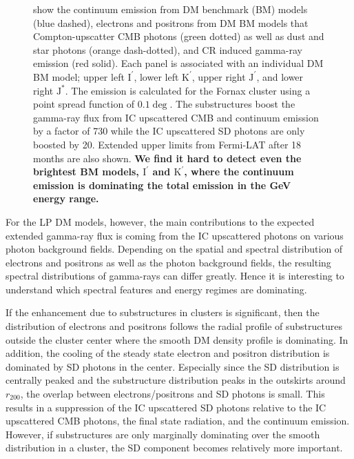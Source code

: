 \documentclass[10pt,aps,pra,reprint,amsmath,amsfonts,amssymb,showpacs,nofootinbib,floatfix]{revtex4-1}
\def\C#1{{\bf #1}}
\newcommand{\rmn}{\mathrm}
\newcommand{\Kp}{\rmn{K}^\prime}
\newcommand{\Ip}{\rmn{I}^\prime}
\newcommand{\Js}{\rmn{J}^*}
\newcommand{\Jp}{\rmn{J}^\prime}
\newcommand{\rvir}{r_{200}}
\begin{document}
\begin{figure}
\begin{minipage}{2.0\columnwidth}
{  show the continuum emission from DM benchmark (BM) models (blue
  dashed), electrons and positrons from DM BM models that
  Compton-upscatter CMB photons (green dotted) as well as dust and
  star photons (orange dash-dotted), and CR induced gamma-ray emission
  (red solid). Each panel is associated with an individual DM BM
  model; upper left $\Ip$, lower left $\Kp$, upper right $\Jp$, and
  lower right $\Js$. The emission is calculated for the Fornax cluster
  using a point spread function of $0.1\deg$. The substructures boost
  the gamma-ray flux from IC upscattered CMB and continuum emission by
  a factor of 730 while the IC upscattered SD photons are only boosted
  by 20. Extended upper limits from Fermi-LAT after 18 months \protect
  \cite{2010ApJ...717L..71A} are also shown. \C{We find it hard to
    detect even the brightest BM models, $\Ip$ and $\Kp$, where the
    continuum emission is dominating the total emission in the
    GeV energy range.}}
 \label{fig:diff_BM}
\end{minipage}
\end{figure}

For the LP DM models, however, the main contributions
to the expected extended gamma-ray flux is coming from the IC
upscattered photons on various photon background fields. Depending on
the spatial and spectral distribution of electrons and positrons as
well as the photon background fields, the resulting spectral
distributions of gamma-rays can differ greatly. Hence it is interesting
to understand which spectral features and energy regimes are
dominating.

If the enhancement due to substructures in clusters is significant,
then the distribution of electrons and positrons follows the radial
profile of substructures outside the cluster center where the smooth
DM density profile is dominating. In addition, the cooling of the
steady state electron and positron distribution is dominated by SD
photons in the center. Especially since the SD distribution is
centrally peaked and the substructure distribution peaks in the
outskirts around $\rvir$, the overlap between electrons/positrons and
SD photons is small. This results in a suppression of the IC
upscattered SD photons relative to the IC upscattered CMB photons, the
final state radiation, and the continuum emission. However, if
substructures are only marginally dominating over the smooth
distribution in a cluster, the SD component becomes relatively more
important.
\end{document}

